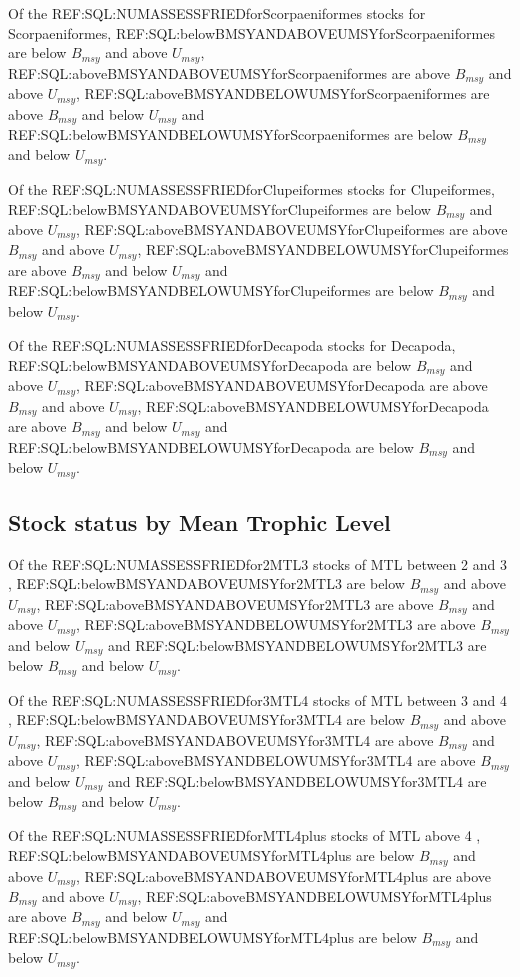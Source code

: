 Of the REF:SQL:NUMASSESSFRIEDforScorpaeniformes stocks for Scorpaeniformes, REF:SQL:belowBMSYANDABOVEUMSYforScorpaeniformes are below $B_{msy}$ and above $U_{msy}$, REF:SQL:aboveBMSYANDABOVEUMSYforScorpaeniformes are above $B_{msy}$ and above $U_{msy}$, REF:SQL:aboveBMSYANDBELOWUMSYforScorpaeniformes are above $B_{msy}$ and below $U_{msy}$ and REF:SQL:belowBMSYANDBELOWUMSYforScorpaeniformes are below $B_{msy}$ and below $U_{msy}$.

Of the REF:SQL:NUMASSESSFRIEDforClupeiformes stocks for Clupeiformes, REF:SQL:belowBMSYANDABOVEUMSYforClupeiformes are below $B_{msy}$ and above $U_{msy}$, REF:SQL:aboveBMSYANDABOVEUMSYforClupeiformes are above $B_{msy}$ and above $U_{msy}$, REF:SQL:aboveBMSYANDBELOWUMSYforClupeiformes are above $B_{msy}$ and below $U_{msy}$ and REF:SQL:belowBMSYANDBELOWUMSYforClupeiformes are below $B_{msy}$ and below $U_{msy}$.

Of the REF:SQL:NUMASSESSFRIEDforDecapoda stocks for Decapoda, REF:SQL:belowBMSYANDABOVEUMSYforDecapoda are below $B_{msy}$ and above $U_{msy}$, REF:SQL:aboveBMSYANDABOVEUMSYforDecapoda are above $B_{msy}$ and above $U_{msy}$, REF:SQL:aboveBMSYANDBELOWUMSYforDecapoda are above $B_{msy}$ and below $U_{msy}$ and REF:SQL:belowBMSYANDBELOWUMSYforDecapoda are below $B_{msy}$ and below $U_{msy}$.


\subsection*{Stock status by Mean Trophic Level}
Of the REF:SQL:NUMASSESSFRIEDfor2MTL3 stocks of MTL between 2 and 3 , REF:SQL:belowBMSYANDABOVEUMSYfor2MTL3 are below $B_{msy}$ and above $U_{msy}$, REF:SQL:aboveBMSYANDABOVEUMSYfor2MTL3 are above $B_{msy}$ and above $U_{msy}$, REF:SQL:aboveBMSYANDBELOWUMSYfor2MTL3 are above $B_{msy}$ and below $U_{msy}$ and REF:SQL:belowBMSYANDBELOWUMSYfor2MTL3 are below $B_{msy}$ and below $U_{msy}$.

Of the REF:SQL:NUMASSESSFRIEDfor3MTL4 stocks of MTL between 3 and 4 , REF:SQL:belowBMSYANDABOVEUMSYfor3MTL4 are below $B_{msy}$ and above $U_{msy}$, REF:SQL:aboveBMSYANDABOVEUMSYfor3MTL4 are above $B_{msy}$ and above $U_{msy}$, REF:SQL:aboveBMSYANDBELOWUMSYfor3MTL4 are above $B_{msy}$ and below $U_{msy}$ and REF:SQL:belowBMSYANDBELOWUMSYfor3MTL4 are below $B_{msy}$ and below $U_{msy}$.

Of the REF:SQL:NUMASSESSFRIEDforMTL4plus stocks of MTL above 4 , REF:SQL:belowBMSYANDABOVEUMSYforMTL4plus are below $B_{msy}$ and above $U_{msy}$, REF:SQL:aboveBMSYANDABOVEUMSYforMTL4plus are above $B_{msy}$ and above $U_{msy}$, REF:SQL:aboveBMSYANDBELOWUMSYforMTL4plus are above $B_{msy}$ and below $U_{msy}$ and REF:SQL:belowBMSYANDBELOWUMSYforMTL4plus are below $B_{msy}$ and below $U_{msy}$.


